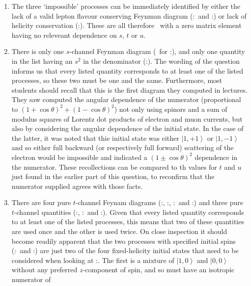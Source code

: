 \documentclass[txfonts]{NSTexam}
\begin{document}
\begin{questions}
\begin{enumerate}
\item
The three `impossible' processes can be immediately identified by either the lack of a valid lepton flavour conserving Feynman diagram  (\numberbadone:\procbadone\ and \numberbadtwo:\procbadtwo) or lack of helicity conservation (\numberbadthr:\procbadthr). These are all therefore \labbadone\ with a zero matrix element having no releveant dependence on $s$, $t$ or $u$.
\item
There is only one $s$-channel Feynman diagram (\diagannihil\ for \numberannihil:\procannihil), and only one quantity in the list having an $s^2$ in the denominator (\labannihil:\msqannihil).  The wording of the question informs us that every listed quantity corresponds to at least one of the listed processes, so these two must be one and the same. Furthermore, most students should recall that this is the first diagram they computed in lectures.  They saw computed the angular dependence of the numerator (proportional to $(1+\cos\theta)^2 + (1-\cos\theta)^2$) not only using spinors and a sum of modulus squares of Lorentz dot products of electron and muon currents, but also by considering the angular dependence of the initial state.  In the case of the latter, it was noted that thie initial state was either $\left|1,+1\right>$ or $\left|1, -1\right>$ and so either full backward (or respectively full forward) scattering of the electron would be impossible and indicated a $(1\pm\cos\theta)^2$ dependence in the numerator. These recollections can be compared to th values for $t$ and $u$ just found in the earlier part of this question, to reconfirm that the numerator supplied agrees with those facts.
\item
There are four pure $t$-channel Feynam diagrams (\numberemuOS:\procemuOS, \numberemuSS:\procemuSS, \numbereRmuR:\proceRmuR\ and \numbereRmuL:\proceRmuL) and three pure $t$-channel quantities (\labemuOS:\msqemuOS, \labeRmuR:\msqeRmuR\ and \labeRmuL:\msqeRmuL). Given that every listed quantity corresponds to at least one of the listed processes, this means that 
two of these quantities are used once and the other is used twice. On close inspection it should become readily apparent that the two processes with specified initial spins (\numbereRmuR:\proceRmuR\ and \numbereRmuL:\proceRmuL) are just two of the four fixed-helicity initial states that need to be considered when looking at \numberemuSS:\procemuSS.  The first is a mixture of $\left|1,0\right>$ and $\left|0,0\right>$ without any preferred $z$-component of spin, and so must have an isotropic numerator of

\end{enumerate}
\end{questions}
\end{document}
